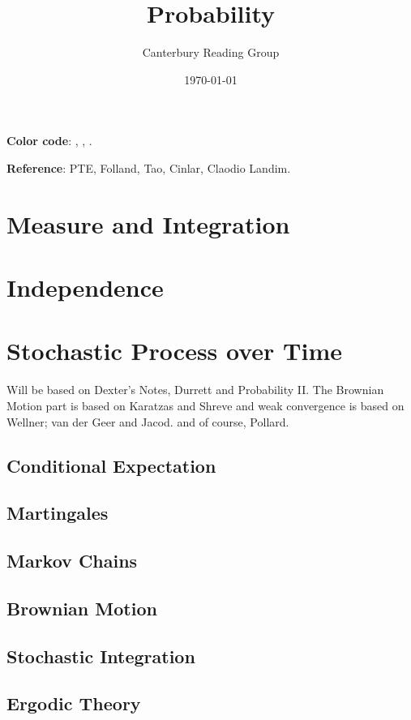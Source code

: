 \documentclass[12pt, oneside]{book}
\begin{document}
    \title{Probability}\author{Canterbury Reading Group}\date{\today}
    \setcounter{tocdepth}{3}
    \tableofcontents

    \textbf{Color code}: , , . 

    \textbf{Reference}: PTE, Folland, Tao, Cinlar, Claodio Landim.
    \chapter{Measure and Integration}
    \chapter{Independence}
    \chapter{Stochastic Process over Time}
        Will be based on Dexter's Notes, Durrett and Probability II. The Brownian Motion part is based on Karatzas and Shreve and weak convergence is based on Wellner; van der Geer and Jacod. and of course, Pollard. 
        \section{Conditional Expectation}
        \section{Martingales}
        \section{Markov Chains}
        \section{Brownian Motion}
        \section{Stochastic Integration}
        \section{Ergodic Theory}
    \appendix
\end{document}
